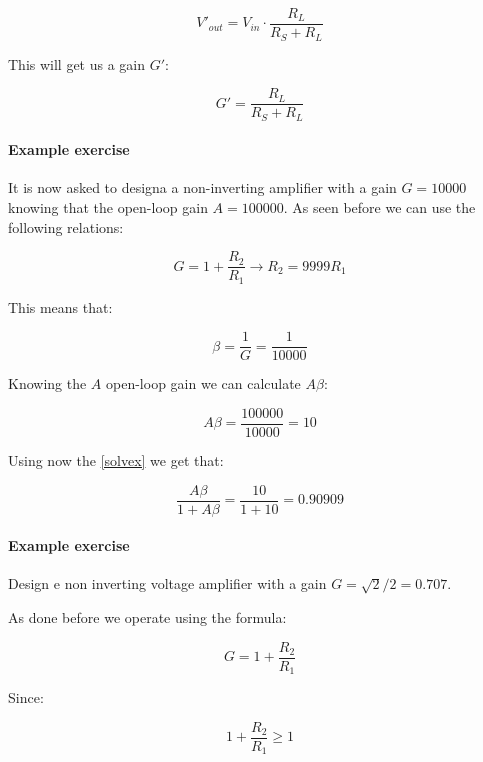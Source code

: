 \documentclass[../main.tex]{subfiles}
\begin{document}
\begin{equation}
	V'_{out} = V_{in} \cdot \frac{R_L}{R_S + R_L}
\end{equation}

This will get us a gain $G'$:

\begin{equation}
	G' = \frac{R_L}{R_S + R_L}
\end{equation}


\paragraph{Example exercise} It is now asked to designa a non-inverting amplifier with a gain $G = 10000$ knowing that the open-loop gain $A = 100000$.
As seen before we can use the following relations:

\begin{equation}
	G = 1 + \frac{R_2}{R_1} \rightarrow R_2 = 9999R_1
\end{equation}

This means that:

\begin{equation}
	\beta = \frac{1}{G} = \frac{1}{10000}
\end{equation}

Knowing the $A$ open-loop gain we can calculate $A\beta$:

\begin{equation}
	A\beta = \frac{100000}{10000} = 10
\end{equation}

Using now the \autoref{solvex} we get that:

\begin{equation}
	\frac{A\beta}{1 + A\beta} = \frac{10}{1 + 10} = 0.90909
\end{equation}


\paragraph{Example exercise} Design e non inverting voltage amplifier with a gain $G = \sqrt{2}/2 = 0.707$.

As done before we operate using the formula:

\begin{equation}
	G = 1 + \frac{R_2}{R_1}
\end{equation}

Since:

\begin{equation}
	1 + \frac{R_2}{R_1} \geq 1
\end{equation}
\end{document}
